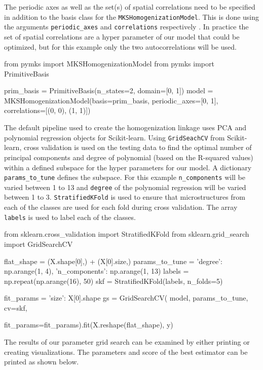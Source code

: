 \documentclass{bmcart}
\begin{document}
The periodic axes as well as the set(s) of spatial correlations need to be specified in addition to the basis class for the
\texttt{MKSHomogenizationModel}. This is done using the arguments
\texttt{periodic\_axes} and \texttt{correlations} respectively . In
practice the set of spatial correlations are a hyper parameter of our
model that could be optimized, but for this example only the two
autocorrelations will be used.


\begin{_input}
from pymks import MKSHomogenizationModel
from pymks import PrimitiveBasis

prim_basis = PrimitiveBasis(n_states=2, domain=[0, 1])
model = MKSHomogenizationModel(basis=prim_basis,
                               periodic_axes=[0, 1], 
                               correlations=[(0, 0), (1, 1)])
\end{_input}
    The default pipeline used to create the homogenization linkage uses PCA
and polynomial regression objects for Scikit-learn. Using
\texttt{GridSeachCV} from Scikit-learn, cross validation is used on the
testing data to find the optimal number of principal components and
degree of polynomial (based on the R-squared values) within a defined
subspace for the hyper parameters for our model. A dictionary
\texttt{params\_to\_tune} defines the subspace. For this example
\texttt{n\_components} will be varied between 1 to 13 and
\texttt{degree} of the polynomial regression will be varied between 1 to
3. \texttt{StratifiedKFold} is used to ensure that microstructures from
each of the classes are used for each fold during cross validation. The
array \texttt{labels} is used to label each of the classes.


\begin{_input}
from sklearn.cross_validation import StratifiedKFold
from sklearn.grid_search import GridSearchCV

flat_shape = (X.shape[0],) + (X[0].size,)
params_to_tune = {'degree': np.arange(1, 4),
                  'n_components': np.arange(1, 13)}
labels = np.repeat(np.arange(16), 50)
skf = StratifiedKFold(labels, n_folds=5)

fit_params = {'size': X[0].shape}
gs = GridSearchCV(
    model, params_to_tune, cv=skf,
    \usepackage{courier}fit_params=fit_params).fit(X.reshape(flat_shape), y)

\end{_input}

    The results of our parameter grid search can be examined by either
printing or creating visualizations. The parameters and
score of the best estimator can be printed as shown below.
\end{document}
